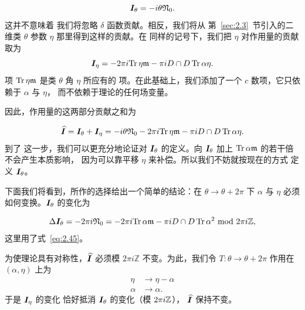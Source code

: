 \setcounter{equation}{45}
\begin{equation}\label{eq:2.46}
  \bm{I}_\theta=-i\theta {\mathfrak{N}}_0.
\end{equation}
 这并不意味着
我们将忽略 $\delta$ 函数贡献。相反，我们将从
第~\ref{sec:2.3}~节引入的二维类 $\theta$ 参数 $\eta$ 那里得到这样的贡献。在
同样的记号下，我们把 $\eta$ 对作用量的贡献取为
\setcounter{equation}{46}
\begin{equation}\label{eq:2.47}
  \bm{I}_\eta=-2\pi i {\rm Tr}\,\eta{\mathfrak{m}}-\pi i D\cap
D\,{\rm Tr}\,\alpha\eta .
\end{equation}
  项 ${\rm Tr}\,\eta{\mathfrak{m}}$ 是类 $\theta$ 角 $\eta$ 所应有的
项。在此基础上，我们添加了一个 $c$ 数项，它只依赖于 $\alpha$ 与 $\eta$，
而不依赖于理论的任何场变量。

因此，作用量的这两部分贡献之和为

\setcounter{equation}{47}
\begin{equation}\label{eq:2.48}
  \widehat {\bm{I}} = \bm{I}_\theta+\bm{I}_\eta= -i\theta {\mathfrak{N}}_0-2\pi i{\rm Tr}\,\eta{\mathfrak{m}}-\pi iD\cap D\, {\rm Tr}\,\alpha\eta .
\end{equation}
 到了
这一步，我们可以更充分地论证对 $\bm{I}_\theta$ 的定义。向 $\bm{I}_\theta$ 加上
${\rm Tr}\,\alpha{\mathfrak{m}}$ 的若干倍
不会产生本质影响，
因为可以靠平移 $\eta$ 来补偿。所以我们不妨就按现在的方式
定义 $\bm{I}_\theta$。

下面我们将看到，所作的选择给出一个简单的结论：在
$\theta\to\theta+2\pi$ 下 $\alpha$ 与 $\eta$ 必须如何变换。$ \bm{I}_\theta$ 的变化为

\setcounter{equation}{48}
\begin{equation}\label{eq:2.49}
  \Delta \bm{I}_\theta=-2\pi i {\mathfrak{N}}_0=-2\pi
i{\rm Tr}\,\alpha{\mathfrak{m}}-\pi i D\cap D\,{\rm Tr}\,\alpha^2 ~{\rm mod}~2\pi
i {\mathbb{Z}} ,
\end{equation}
 这里用了式~\eqref{eq:2.45}。


为使理论具有对称性，$\widehat {\bm{I}}$ 必须模
$2\pi i\mathbb{Z}$ 不变。为此，我们令 $T:\theta\to\theta+2\pi$ 作用在
$(\alpha,\eta)$ 上为
\setcounter{equation}{49}
\begin{equation}\label{eq:2.50}
  \begin{aligned}\eta&\to\eta-\alpha\\
\alpha&\to \alpha.\end{aligned}
\end{equation}
  于是 $\bm{I}_\eta$ 的变化
恰好抵消 $\bm{I}_\theta$ 的变化（模 $2\pi i{\mathbb{Z}}$），
$\widehat {\bm{I}}$ 保持不变。

